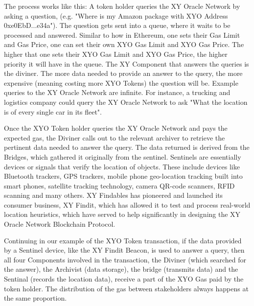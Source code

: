 \documentclass{article}
\begin{document}
The process works like this: A token holder queries the XY Oracle Network by asking a question, (e.g. "Where is my Amazon package with XYO Address  0xe0EbD...e34a"). The question gets sent into a queue, where it waits to be processed and answered. Similar to how in Ethereum, one sets their Gas Limit and Gas Price, one can set their own XYO Gas Limit and XYO Gas Price. The higher that one sets their XYO Gas Limit and XYO Gas Price, the higher priority it will have in the queue. The XY Component that answers the queries is the \gls{diviner}. The more data needed to provide an answer to the query, the more expensive (meaning costing more XYO Tokens) the question will be. Example queries to the XY Oracle Network are infinite. For instance, a trucking and logistics company could query the XY Oracle Network to ask "What the location is of every single car in its fleet". 

Once the XYO Token holder queries the XY Oracle Network and pays the expected gas, the Diviner calls out to the relevant \gls{archiver} to retrieve the pertinent data needed to answer the query. The data returned is derived from the Bridges, which gathered it originally from the \gls{sentinel}. Sentinels are essentially devices or signals that verify the location of objects. These include devices like Bluetooth trackers, GPS trackers, mobile phone geo-location tracking built into smart phones, satellite tracking technology, camera QR-code scanners, RFID scanning and many others. XY Findables has pioneered and launched its consumer business, XY Findit, which has allowed it to test and process real-world location heuristics, which have served to help significantly in designing the XY Oracle Network Blockchain Protocol. 

Continuing in our example of the XYO Token transaction, if the data provided by a Sentinel device, like the XY Findit Beacon, is used to answer a query, then all four Components involved in the transaction, the Diviner (which searched for the answer), the Archivist (data storage), the \gls{bridge} (transmits data) and the Sentinal (records the location data), receive a part of the XYO Gas paid by the token holder. The distribution of the gas between stakeholders always happens at the same proportion.
\end{document}
